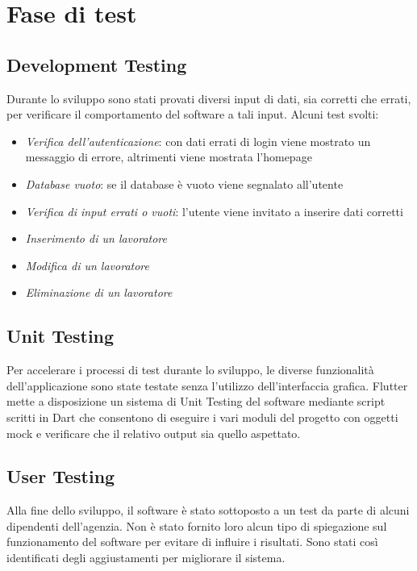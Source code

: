 \documentclass[a4paper, oneside, 12pt]{article}
\begin{document}
\section{Fase di test}

\subsection{Development Testing}
Durante lo sviluppo sono stati provati diversi input di dati, sia corretti che errati, per
verificare il comportamento del software a tali input.
Alcuni test svolti:
\begin{itemize}
	\item \textit{Verifica dell'autenticazione}: con dati errati di login viene mostrato un messaggio di errore, altrimenti viene mostrata l'homepage
	\item \textit{Database vuoto}: se il database è vuoto viene segnalato all'utente
	\item \textit{Verifica di input errati o vuoti}: l'utente viene invitato a inserire dati corretti
	\item \textit{Inserimento di un lavoratore}
	\item \textit{Modifica di un lavoratore}
	\item \textit{Eliminazione di un lavoratore}
\end{itemize}

\subsection{Unit Testing}

Per accelerare i processi di test durante lo sviluppo, le diverse funzionalità dell'applicazione 
sono state testate senza l'utilizzo dell'interfaccia grafica. Flutter mette a disposizione un sistema 
di Unit Testing del software mediante script scritti in Dart che consentono di eseguire i vari moduli del progetto
con oggetti mock e verificare che il relativo output sia quello aspettato.


\subsection{User Testing}
Alla fine dello sviluppo, il software è stato sottoposto a un test da parte di alcuni dipendenti dell'agenzia.
Non è stato fornito loro alcun tipo di spiegazione sul funzionamento del software per evitare di influire i risultati.
Sono stati così identificati degli aggiustamenti per migliorare il sistema.
\end{document}
